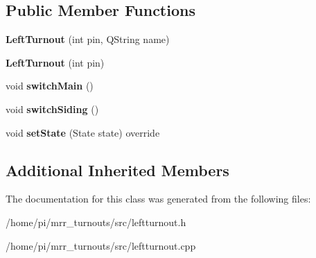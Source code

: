 \subsection*{Public Member Functions}
\begin{DoxyCompactItemize}
\item 
\mbox{\label{classLeftTurnout_ae24ebadb9be727241ac5c4c4eb8b28cf}} 
{\bfseries Left\+Turnout} (int pin, Q\+String name)
\item 
\mbox{\label{classLeftTurnout_a21a5aec6ff475925dc2b73cfb330b931}} 
{\bfseries Left\+Turnout} (int pin)
\item 
\mbox{\label{classLeftTurnout_a6a8de3619f56aa15e15bad2da854422c}} 
void {\bfseries switch\+Main} ()
\item 
\mbox{\label{classLeftTurnout_ac8538da3d201212a772689c10a428ccd}} 
void {\bfseries switch\+Siding} ()
\item 
\mbox{\label{classLeftTurnout_a21039a96b6d6de81d80f320ee34d1032}} 
void {\bfseries set\+State} (State state) override
\end{DoxyCompactItemize}
\subsection*{Additional Inherited Members}


The documentation for this class was generated from the following files\+:\begin{DoxyCompactItemize}
\item 
/home/pi/mrr\+\_\+turnouts/src/leftturnout.\+h\item 
/home/pi/mrr\+\_\+turnouts/src/leftturnout.\+cpp\end{DoxyCompactItemize}
